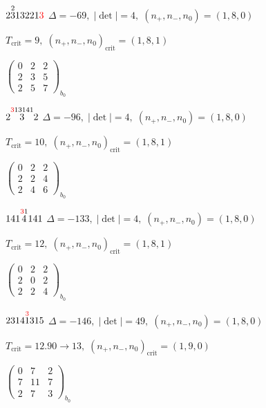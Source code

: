 \documentclass[10pt]{article}
\begin{document}
$2\overset{2}{3}13221\textcolor{red}{3}$ \quad $\Delta=-69,\; |\det|=4,\; (n_+,n_-,n_0)=(1,8,0)$

\hspace{1em}$T_{\text{crit}}=9,\; (n_+,n_-,n_0)_{\text{crit}}=(1,8,1)$

\hspace{2em}$\left(\begin{smallmatrix}0 & 2 & 2 \\ 2 & 3 & 5 \\ 2 & 5 & 7\end{smallmatrix}\right)_{\!b_0}$

\smallskip

$2\overset{\textcolor{red}{3}13141}{3}2$ \quad $\Delta=-96,\; |\det|=4,\; (n_+,n_-,n_0)=(1,8,0)$

\hspace{1em}$T_{\text{crit}}=10,\; (n_+,n_-,n_0)_{\text{crit}}=(1,8,1)$

\hspace{2em}$\left(\begin{smallmatrix}0 & 2 & 2 \\ 2 & 2 & 4 \\ 2 & 4 & 6\end{smallmatrix}\right)_{\!b_0}$

\smallskip

$141\overset{\textcolor{red}{3}1}{4}141$ \quad $\Delta=-133,\; |\det|=4,\; (n_+,n_-,n_0)=(1,8,0)$

\hspace{1em}$T_{\text{crit}}=12,\; (n_+,n_-,n_0)_{\text{crit}}=(1,8,1)$

\hspace{2em}$\left(\begin{smallmatrix}0 & 2 & 2 \\ 2 & 0 & 2 \\ 2 & 2 & 4\end{smallmatrix}\right)_{\!b_0}$

\smallskip

$2314\overset{\textcolor{red}{3}}{1}315$ \quad $\Delta=-146,\; |\det|=49,\; (n_+,n_-,n_0)=(1,8,0)$

\hspace{1em}$T_{\text{crit}}=12.90 \to 13,\; (n_+,n_-,n_0)_{\text{crit}}=(1,9,0)$

\hspace{2em}$\left(\begin{smallmatrix}0 & 7 & 2 \\ 7 & 11 & 7 \\ 2 & 7 & 3\end{smallmatrix}\right)_{\!b_0}$
\end{document}
